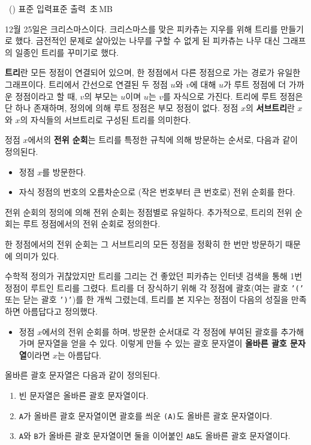 \begin{problem}{\kcpcprobpretty\ (\kcpcprobprettyshort)}
    {표준 입력}{표준 출력}
    {\kcpcprobprettytime\,초}{\kcpcprobprettymemory\,MB}{}
     
    12월 25일은 크리스마스이다. 크리스마스를 맞은 피카츄는 지우를 위해 트리를 만들기로 했다. 금전적인 문제로 살아있는 나무를 구할 수 없게 된 피카츄는 나무 대신 그래프의 일종인 트리를 꾸미기로 했다.
    
    \textbf{트리}란 모든 정점이 연결되어 있으며, 한 정점에서 다른 정점으로 가는 경로가 유일한 그래프이다. 트리에서 간선으로 연결된 두 정점 $u$와 $v$에 대해 $u$가 루트 정점에 더 가까운 정점이라고 할 때, $v$의 부모는 $u$이며 $u$는 $v$를 자식으로 가진다. 트리에 루트 정점은 단 하나 존재하며, 정의에 의해 루트 정점은 부모 정점이 없다. 정점 $x$의 \textbf{서브트리}란 $x$와 $x$의 자식들의 서브트리로 구성된 트리를 의미한다.
    
    정점 $x$에서의 \textbf{전위 순회}는 트리를 특정한 규칙에 의해 방문하는 순서로, 다음과 같이 정의된다.
    
    \begin{itemize}
        \item 정점 $x$를 방문한다.
        \item 자식 정점의 번호의 오름차순으로 (작은 번호부터 큰 번호로) 전위 순회를 한다.
    \end{itemize}
    전위 순회의 정의에 의해 전위 순회는 정점별로 유일하다. 추가적으로, 트리의 전위 순회는 루트 정점에서의 전위 순회로 정의한다.
    
    한 정점에서의 전위 순회는 그 서브트리의 모든 정점을 정확히 한 번만 방문하기 때문에 의미가 있다.
    
    수학적 정의가 귀찮았지만 트리를 그리는 건 좋았던 피카츄는 인터넷 검색을 통해 1번 정점이 루트인 트리를 그렸다. 트리를 더 장식하기 위해 각 정점에 괄호(여는 괄호 \texttt{'('} 또는 닫는 괄호 \texttt{')'})를 한 개씩 그렸는데, 트리를 본 지우는 정점이 다음의 성질을 만족하면 아름답다고 정의했다.
    
    \begin{itemize}
        \item 정점 $x$에서의 전위 순회를 하며, 방문한 순서대로 각 정점에 부여된 괄호를 추가해가며 문자열을 얻을 수 있다. 이렇게 만들 수 있는 괄호 문자열이 \textbf{올바른 괄호 문자열}이라면 $ x $는 아름답다.    
    \end{itemize}
    
    올바른 괄호 문자열은 다음과 같이 정의된다.
    \begin{enumerate}
        \item 빈 문자열은 올바른 괄호 문자열이다.
        \item \texttt{A}가 올바른 괄호 문자열이면 괄호를 씌운 \texttt{(A)}도 올바른 괄호 문자열이다.
        \item \texttt{A}와 \texttt{B}가 올바른 괄호 문자열이면 둘을 이어붙인 \texttt{AB}도 올바른 괄호 문자열이다.
    \end{enumerate}
    

\end{problem}

